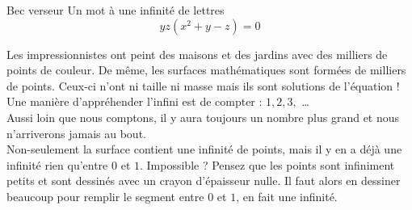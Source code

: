 \begin{surferPage}{Bec verseur}
Un mot à une infinité de lettres\\
\smallskip
\[y z (x^2	+ y - z)	= 0\]

\vspace{0.3cm}
Les impressionnistes ont peint des maisons et des jardins avec des milliers de points de couleur. De même, les surfaces mathématiques sont formées de milliers de points. Ceux-ci n'ont ni taille ni masse mais ils sont solutions de l'équation ! \\
\vspace{0.3cm}
Une manière d'appréhender l'infini est de compter : $1, 2, 3,$ \dots\\
Aussi loin que nous comptons, il y aura toujours un nombre plus grand et nous n'arriverons jamais au bout.\\
\vspace{0.3cm}
Non-seulement la surface contient une infinité de points, mais il y en a déjà une infinité rien qu'entre $0$ et $1$. Impossible ? Pensez que les points sont infiniment petits et sont dessinés avec un crayon d'épaisseur nulle. Il faut alors en dessiner beaucoup pour remplir le segment entre $0$ et $1$, en fait une infinité.
\end{surferPage}
